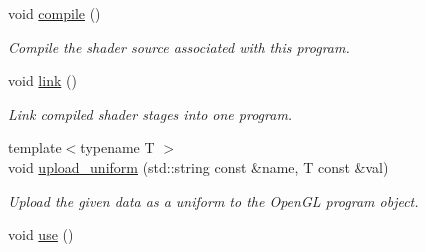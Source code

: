 \begin{DoxyCompactItemize}
\item 
void \hyperlink{classgfx_1_1program_ab925e8e749e08329b745635c388c3428}{compile} ()
\begin{DoxyCompactList}\small\item\em Compile the shader source associated with this program. \end{DoxyCompactList}\item 
void \hyperlink{classgfx_1_1program_a1fc41748646f62dd4dd98c7e9d012166}{link} ()
\begin{DoxyCompactList}\small\item\em Link compiled shader stages into one program. \end{DoxyCompactList}\item 
{\footnotesize template$<$typename T $>$ }\\void \hyperlink{classgfx_1_1program_aaf1cf681d9a5a75d121b6dba5794dceb}{upload\-\_\-uniform} (std\-::string const \&name, T const \&val)
\begin{DoxyCompactList}\small\item\em Upload the given data as a uniform to the Open\-G\-L program object. \end{DoxyCompactList}\item 
\hypertarget{classgfx_1_1program_a94f585db55bbc7933f5d4a4bcfb7cfc0}{void \hyperlink{classgfx_1_1program_a94f585db55bbc7933f5d4a4bcfb7cfc0}{use} ()}\label{classgfx_1_1program_a94f585db55bbc7933f5d4a4bcfb7cfc0}


\end{DoxyCompactItemize}

